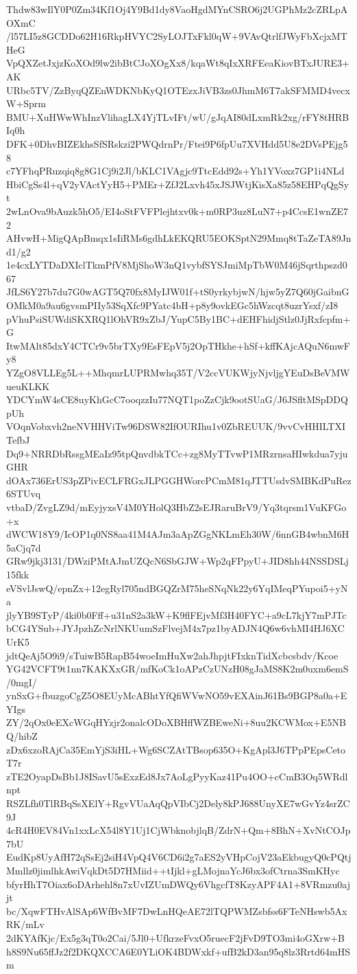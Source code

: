 Thdw83wIlY0P0Zm34Kf1Oj4Y9Bd1dy8VaoHgdMYnCSRO6j2UGPhMz2cZRLpAOXmC
/l57LI5z8GCDDo62H16RkpHVYC2SyLOJTxFkl0qW+9VAvQtrlfJWyFbXcjxMTHeG
VpQXZetJxjzKoXOd9lw2ibBtCJoXOgXx8/kqaWt8qIxXRFEeaKiovBTxJURE3+AK
URbc5TV/ZzByqQZEnWDKNbKyQ1OTEzxJiVB3zs0JhmM6T7akSFMMD4vecxW+Sprm
BMU+XuHWwWhInzVlihagLX4YjTLvIFt/wU/gJqAI80dLxmRk2xg/rFY8tHRBIq0h
DFK+0DhvBIZEkhsSfSRskzi2PWQdrnPr/Ftei9P6fpUu7XVHdd5U8e2DVsPEjg58
c7YFhqPRuzqiq8g8G1Cj9i2Jl/bKLC1VAgjc9TtcEdd92s+Yh1YVoxz7GP1i4NLd
HbiCgSs4l+qV2yVActYyH5+PMEr+ZfJ2Lxvh45xJSJWtjKisXa85z58EHPqQgSyt
2wLnOva9bAuzk5hO5/EI4oStFVFPlejhtxv0k+m0RP3uz8LuN7+p4CcsE1wnZE72
AHvwH+MigQApBmqx1sIiRMs6gdhLkEKQRU5EOKSptN29Mmq8tTaZeTA89Jnd1/g2
1e4cxLYTDaDXIclTkmPfV8MjShoW3nQ1vybfSYSJmiMpTbW0M46jSqrthpszd067
JfLS6Y27b7du7G0wAGT5Q70fx8MyIJW01f+tS0yrkybjwN/hjw5yZ7Q60jGaibnG
OMkM0a9au6gvsmPIIy53SqXfc9PYatc4bH+p8y9ovkEGc5hWzcqt8uzrYsxf/zI8
pVhuPsiSUWdiSKXRQ1lOhVR9xZbJ/YupC5By1BC+dEHFhidjStlz0JjRxfcpfm+G
ItwMAlt85dxY4CTCr9v5brTXy9EsFEpV5j2OpTHkhe+hSf+kffKAjcAQuN6mwFy8
YZgO8VLLEg5L++MhqmrLUPRMwhq35T/V2ccVUKWjyNjvljgYEuDsBeVMWueuKLKK
YDCYmW4sCE8uyKhGcC7ooqzzIu77NQT1poZzCjk9ootSUaG/J6JSfltMSpDDQpUh
VOqnVobxvh2neNVHHViTw96DSW82IfOURIhu1v0ZbREUUK/9vvCvHHILTXITefbJ
Dq9+NRRDbRssgMEaIz95tpQnvdbkTCc+zg8MyTTvwP1MRzrnsaHIwkdua7yjuGHR
dOAx736ErUS3pZPivECLFRGxJLPGGHWorcPCmM81qJTTUsdvSMBKdPuRez6STUvq
vtbaD/ZvgLZ9d/mEyjyxsV4M0YHolQ3HbZ2sEJRaruBrV9/Yq3tqrsm1VuKFGo+x
dWCW18Y9/IcOP1q0NS8aa41M4AJm3aApZGgNKLmEh30W/6nnGB4wbnM6H5aCjq7d
GRw9jkj3131/DWziPMtAJmUZQcN6SbGJW+Wp2qFPpyU+JID8hh44NSSDSLj15fkk
eVSvlJswQ/epnZx+12egRyl705ndBGQZrM75heSNqNk22y6YqIMeqPYupoi5+yNa
jlyYB9STyP/4ki0b0Fff+u31nS2a3kW+K9flFEjvMf3H40FYC+a9cL7kjY7mPJTc
bCG4YSub+JYJpzhZcNrlNKUumSzFlvejM4x7pz1byADJN4Q6w6vhMI4HJ6XCUrK5
jdtQeAj5O9i9/sTuiwB5RapB54woeImHuXw2ahJhpjtFIxknTidXcbcsbdv/Kcoe
YG42VCFT9t1nn7KAKXxGR/mfKoCk1oAPzCzUNzH08gJaMS8K2m0uxm6emS/0mgI/
ynSxG+fbuzgoCgZ5O8EUyMcABhtYfQfiWVwNO59vEXAinJ61Bs9BGP8a0a+EYIgs
ZY/2qOx0eEXcWGqHYzjr2onalcODoXBHffWZBEweNi+8uu2KCWMox+E5NBQ/hibZ
zDx6xzoRAjCa35EmYjS3iHL+Wg6SCZAtTBsop635O+KgApl3J6TPpPEpsCetoT7r
zTE2OyapDsBb1J8ISavU5sExzEd8Jx7AoLgPyyKaz41Pu4OO+cCmB3Oq5WRdlnpt
RSZLfh0TlRBqSsXElY+RgvVUaAqQpVIbCj2Dely8kPJ688UnyXE7wGvYz4srZC9J
4cR4H0EV84Vn1xxLcX54l8Y1Uj1CjWbknobjlqB/ZdrN+Qm+8BhN+XvNtCOJp7bU
EudKp8UyAfH72qSsEj2siH4VpQ4V6CD6i2g7aES2yVHpCojV23aEkbugyQ0cPQtj
Mmllz0jimlhkAwiVqkDt5D7HMiid++tIjkl+gLMojnaYcJ6bx3ofCtrna3SmKHyc
bfyrHhT7Oiax6oDArhehl8n7xUvIZUmDWQy6VhgcfT8KzyAPF4A1+8VRmzu0ajjt
bc/XqwFTHvAlSAp6WfBvMF7DwLnHQeAE72lTQPWMZsbfss6FTeNHswb5AxRK/mLv
2dKYAfKjc/Ex5g3qT0o2Cai/5Jl0+UfkrzeFvxO5ruecF2jFvD9TO3mi4oGXrw+B
h8S9Nu65ffJz2f2DKQXCCA6E0YLiOK4BDWxkf+ufB2kD3an95q8lz3Rrtd64mHSm
